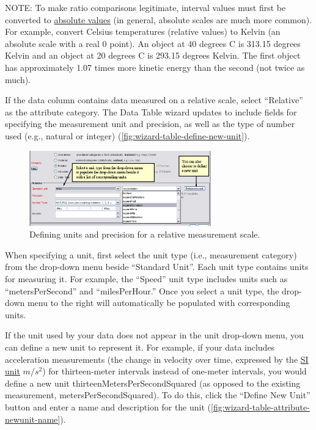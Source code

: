 NOTE: To make ratio comparisons legitimate, interval values must first
be converted to \hyperref[par:cat-absolute]{absolute values} (in
general, absolute scales are much more common). For example, convert
Celsius temperatures (relative values) to Kelvin (an absolute scale with
a real 0 point). An object at 40 degrees C is 313.15 degrees Kelvin and
an object at 20 degrees C is 293.15 degrees Kelvin. The first object has
approximately 1.07 times more kinetic energy than the second (not twice
as much).

If the data column contains data measured on a relative scale, select
``Relative'' as the attribute category. The Data Table wizard updates to
include fields for specifying the measurement unit and precision, as
well as the type of number used (e.g., natural or integer)
(\autoref{fig:wizard-table-define-new-unit}).

\begin{figure}
  \centering
    \includegraphics[width=0.7\textwidth]{images/wizard-table-define-new-unit.jpg}
  \caption{Defining units and precision for a relative measurement
    scale.}
  \label{fig:wizard-table-define-new-unit}
\end{figure}

When specifying a unit, first select the unit type (i.e., measurement
category) from the drop-down menu beside ``Standard Unit''. Each unit
type contains units for measuring it. For example, the ``Speed'' unit
type includes units such as ``metersPerSecond'' and ``milesPerHour.''
Once you select a unit type, the drop-down menu to the right will
automatically be populated with corresponding units.

If the unit used by your data does not appear in the unit drop-down
menu, you can define a new unit to represent it. For example, if your
data includes acceleration measurements (the change in velocity over
time, expressed by the \href{http://en.wikipedia.org/wiki/SI}{SI unit}
$m/s^2$) for thirteen-meter intervals instead of one-meter intervals, you
would define a new unit thirteenMetersPerSecondSquared (as opposed to
the existing measurement, metersPerSecondSquared). To do this, click the
``Define New Unit'' button and enter a name and description for the unit
(\autoref{fig:wizard-table-attribute-newunit-name}). 

